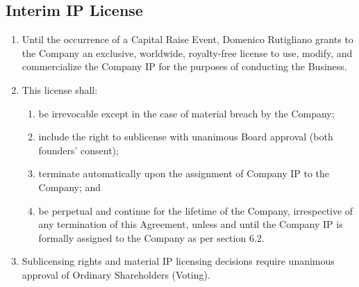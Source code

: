 \subsection{Interim IP License}
\begin{enumerate}[label=(\alph*)]
\item Until the occurrence of a Capital Raise Event, Domenico Rutigliano grants to the Company an exclusive, worldwide, royalty-free license to use, modify, and commercialize the Company IP for the purposes of conducting the Business.

\item This license shall:
    \begin{enumerate}[label=(\roman*)]
    \item be irrevocable except in the case of material breach by the Company;
    \item include the right to sublicense with unanimous Board approval (both founders' consent);
    \item terminate automatically upon the assignment of Company IP to the Company; and
    \item be perpetual and continue for the lifetime of the Company, irrespective of any termination of this Agreement, unless and until the Company IP is formally assigned to the Company as per section 6.2.
    \end{enumerate}

\item Sublicensing rights and material IP licensing decisions require unanimous approval of Ordinary Shareholders (Voting).
\end{enumerate}

